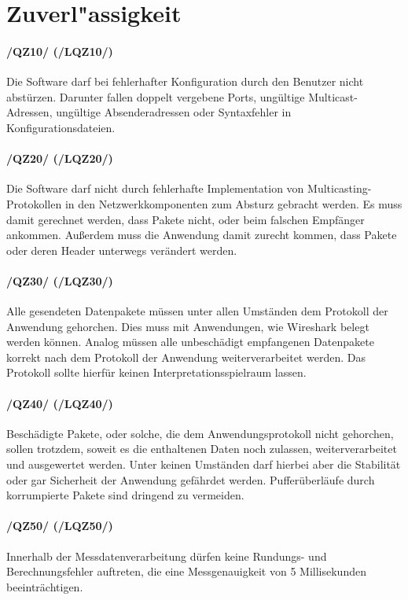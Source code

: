 \section{Zuverl"assigkeit}

\paragraph{/QZ10/ (/LQZ10/)} Die Software darf bei fehlerhafter Konfiguration
durch den Benutzer nicht abstürzen. Darunter fallen doppelt vergebene Ports, ungültige
Multicast-Adressen, ungültige Absenderadressen oder Syntaxfehler in
Konfigurationsdateien.

\paragraph{/QZ20/ (/LQZ20/)} Die Software darf nicht durch fehlerhafte
Implementation von Multicasting-Protokollen in den Netzwerkkomponenten zum Absturz gebracht werden.
Es muss damit gerechnet werden, dass Pakete nicht, oder beim falschen Empfänger
ankommen. Außerdem muss die Anwendung damit zurecht kommen, dass Pakete oder
deren Header unterwegs verändert werden.

\paragraph{/QZ30/ (/LQZ30/)} Alle gesendeten Datenpakete müssen unter allen
Umständen dem Protokoll der Anwendung gehorchen. Dies muss mit Anwendungen, wie
Wireshark belegt werden können. Analog müssen alle unbeschädigt empfangenen
Datenpakete korrekt nach dem Protokoll der Anwendung weiterverarbeitet werden.
Das Protokoll sollte hierfür keinen Interpretationsspielraum lassen.

\paragraph{/QZ40/ (/LQZ40/)} Beschädigte Pakete, oder solche, die dem
Anwendungsprotokoll nicht gehorchen, sollen trotzdem, soweit es die enthaltenen Daten noch zulassen,
weiterverarbeitet und ausgewertet werden. Unter keinen Umständen darf hierbei
aber die Stabilität oder gar Sicherheit der Anwendung gefährdet werden.
Pufferüberläufe durch korrumpierte
Pakete sind dringend zu vermeiden.

\paragraph{/QZ50/ (/LQZ50/)} Innerhalb der Messdatenverarbeitung dürfen keine
Rundungs- und Berechnungsfehler auftreten, die eine Messgenauigkeit von 5
Millisekunden beeinträchtigen.

